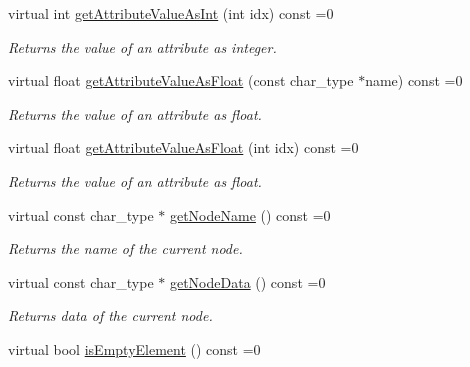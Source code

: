 \begin{DoxyCompactItemize}
virtual int \hyperlink{classirr_1_1io_1_1IIrrXMLReader_ae07b2fef9c200362fc4bb11759428d93}{get\+Attribute\+Value\+As\+Int} (int idx) const  =0
\begin{DoxyCompactList}\small\item\em Returns the value of an attribute as integer. \end{DoxyCompactList}\item 
virtual float \hyperlink{classirr_1_1io_1_1IIrrXMLReader_ae29fd76d29855774c854369047917bac}{get\+Attribute\+Value\+As\+Float} (const char\+\_\+type $\ast$name) const  =0
\begin{DoxyCompactList}\small\item\em Returns the value of an attribute as float. \end{DoxyCompactList}\item 
virtual float \hyperlink{classirr_1_1io_1_1IIrrXMLReader_a9ca89b6f3c930eb94dac0c283cc79b1c}{get\+Attribute\+Value\+As\+Float} (int idx) const  =0
\begin{DoxyCompactList}\small\item\em Returns the value of an attribute as float. \end{DoxyCompactList}\item 
virtual const char\+\_\+type $\ast$ \hyperlink{classirr_1_1io_1_1IIrrXMLReader_a5e168b2f2321eefff0922823072d7c5d}{get\+Node\+Name} () const  =0
\begin{DoxyCompactList}\small\item\em Returns the name of the current node. \end{DoxyCompactList}\item 
virtual const char\+\_\+type $\ast$ \hyperlink{classirr_1_1io_1_1IIrrXMLReader_a0e46cdf194b2c6b6db908989c000ba58}{get\+Node\+Data} () const  =0
\begin{DoxyCompactList}\small\item\em Returns data of the current node. \end{DoxyCompactList}\item 
virtual bool \hyperlink{classirr_1_1io_1_1IIrrXMLReader_a4de66bcaae7f017803b341785c4dab9a}{is\+Empty\+Element} () const  =0\hypertarget{classirr_1_1io_1_1IIrrXMLReader_a4de66bcaae7f017803b341785c4dab9a}{}\label{classirr_1_1io_1_1IIrrXMLReader_a4de66bcaae7f017803b341785c4dab9a}


\end{DoxyCompactItemize}
